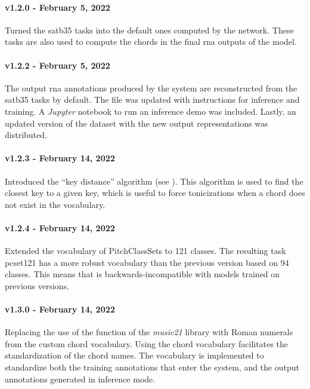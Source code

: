 \paragraph{v1.2.0 - February 5, 2022}
Turned the \gls{satb35} tasks into the default ones computed
by the network. These tasks are also used to compute the
chords in the final \gls{rna} outputs of the model.

\paragraph{v1.2.2 - February 5, 2022}
The output \gls{rna} annotations produced by the system are
reconstructed from the \gls{satb35} tasks by default. The
 file was updated with instructions for
inference and training. A \emph{Jupyter} notebook
\parencite{kluyver2016jupyter} to run an inference demo was
included. Lastly, an updated version of the dataset with the
new output representations was distributed.


\paragraph{v1.2.3 - February 14, 2022}
Introduced the ``key distance'' algorithm (see
). This algorithm is used to
find the closest key to a given key, which is useful to
force tonicizations when a chord does not exist in the
vocabulary.

\paragraph{v1.2.4 - February 14, 2022}
Extended the vocabulary of PitchClassSets to 121 classes.
The resulting task \gls{pcset121} has a more robust
vocabulary than the previous version based on 94 classes.
This means that  is backwards-incompatible with
models trained on previous versions.

\paragraph{v1.3.0 - February 14, 2022}
Replacing the use of the 
function of the \emph{music21}
\parencite{cuthbert2010music21} library with Roman numerals
from the custom chord vocabulary. Using the chord vocabulary
facilitates the standardization of the chord names. The
vocabulary is implemented to standardize both the training
annotations that enter the system, and the output
annotations generated in inference mode.

